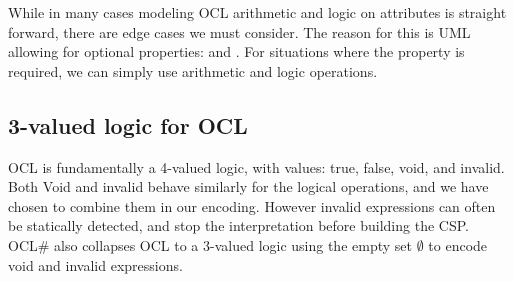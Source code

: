 While in many cases modeling OCL arithmetic and logic on attributes is straight forward, there are edge cases we must consider.
The reason for this is UML allowing for optional properties:  and .
For situations where the property is required, we can simply use arithmetic and logic operations.

\subsection{3-valued logic for OCL}
OCL is fundamentally a 4-valued logic, with values: true, false, void, and invalid.
Both Void and invalid behave similarly for the logical operations, and we have chosen to combine them in our encoding.
However invalid expressions can often be statically detected, and stop the interpretation before building the CSP.
OCL\# also collapses OCL to a 3-valued logic using the empty set $\emptyset$ to encode void and invalid expressions. 

